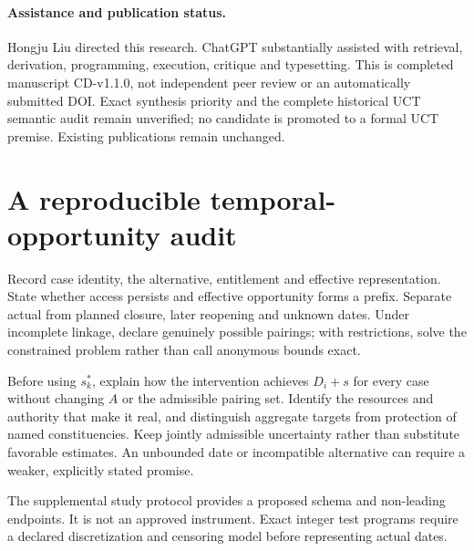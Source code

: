 \documentclass[11pt,a4paper]{article}
\theoremstyle{definition}\newtheorem{definition}{Definition}
\begin{document}
\paragraph{Assistance and publication status.}
Hongju Liu directed this research. ChatGPT substantially assisted with retrieval, derivation, programming, execution, critique and typesetting. This is completed manuscript CD-v1.1.0, not independent peer review or an automatically submitted DOI. Exact synthesis priority and the complete historical UCT semantic audit remain unverified; no candidate is promoted to a formal UCT premise. Existing publications remain unchanged.

\appendix
\section{A reproducible temporal-opportunity audit}
Record case identity, the alternative, entitlement and effective representation. State whether access persists and effective opportunity forms a prefix. Separate actual from planned closure, later reopening and unknown dates. Under incomplete linkage, declare genuinely possible pairings; with restrictions, solve the constrained problem rather than call anonymous bounds exact.

Before using $s_k^*$, explain how the intervention achieves $D_i+s$ for every case without changing $A$ or the admissible pairing set. Identify the resources and authority that make it real, and distinguish aggregate targets from protection of named constituencies. Keep jointly admissible uncertainty rather than substitute favorable estimates. An unbounded date or incompatible alternative can require a weaker, explicitly stated promise.

The supplemental study protocol provides a proposed schema and non-leading endpoints. It is not an approved instrument. Exact integer test programs require a declared discretization and censoring model before representing actual dates.
\end{document}

